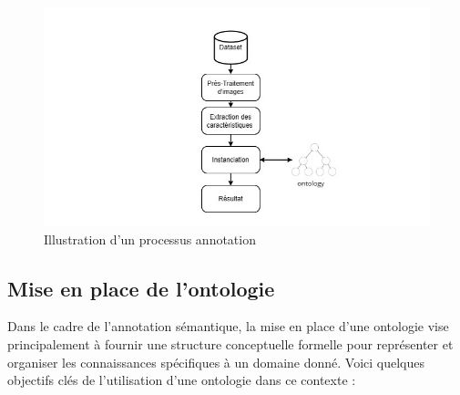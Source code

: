 \begin{figure}[htbp]
	\begin{center}
		\begin{minipage}[b]{0.7\textwidth}
			\centering
			\includegraphics[width=\textwidth]{images/14.png}
			\caption{Illustration d'un processus annotation}
		\end{minipage}
	\end{center}
\end{figure}

\subsection{Mise en place de l'ontologie}
Dans le cadre de l'annotation sémantique, la mise en place d'une ontologie vise principalement à fournir une structure conceptuelle formelle pour représenter et organiser les connaissances spécifiques à un domaine donné. Voici quelques objectifs clés de l'utilisation d'une ontologie dans ce contexte :

